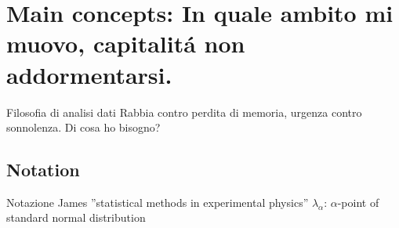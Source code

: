 \section{Main concepts: In quale ambito mi muovo, capitalit\'a non addormentarsi.}

\begin{frame}{Filosofia di analisi dati}
Rabbia contro perdita di memoria, urgenza contro sonnolenza. Di cosa ho bisogno?
\end{frame}

\subsection{Notation}

\begin{wordonframe}{Notazione James ''statistical methods in experimental physics''}
$\lambda_{\alpha}$: $\alpha$-point of standard normal distribution
\end{wordonframe}
